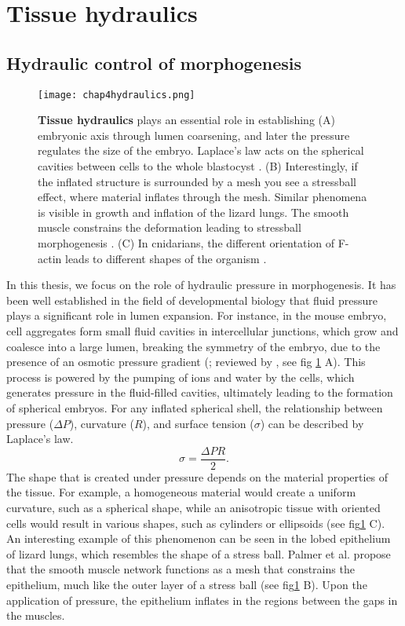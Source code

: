 \hypertarget{tissue-hydraulics}{%
	\section{Tissue hydraulics}\label{tissue-hydraulics}}

\hypertarget{hydraulic-control-of-morphogenesis}{%
	\subsection{Hydraulic control of morphogenesis}\label{hydraulic-control-of-morphogenesis}}


\begin{figure}
	\centering
	\texttt{[image: chap4hydraulics.png]}
	\caption{\label{fig_4_7} \textbf{ Tissue hydraulics} plays an essential role in establishing (A) embryonic axis through lumen coarsening, and later the pressure regulates the size of the embryo. Laplace's law acts on the spherical cavities between cells to the whole blastocyst \cite{dumortier2019,chan2019, collinet2021}. (B) Interestingly, if the inflated structure is surrounded by a mesh you see a stressball effect, where material inflates through the mesh. Similar phenomena is visible in growth and inflation of the lizard lungs. The smooth muscle constrains the deformation leading to stressball morphogenesis \cite{palmer2021}. (C) In cnidarians, the different orientation of F-actin leads to different shapes of the organism \cite{stokkermans2022}.
	}
\end{figure}

In this thesis, we focus on the role of hydraulic pressure in morphogenesis. It has been well established in the field of developmental biology that fluid pressure plays a significant role in lumen expansion. For instance, in the mouse embryo, cell aggregates form small fluid cavities in intercellular junctions, which grow and coalesce into a large lumen, breaking the symmetry of the embryo, due to the presence of an osmotic pressure gradient (\cite{dumortier2019}; reviewed by \cite{torres-sanchez2021}, see fig \ref{fig_4_7} A). This process is powered by the pumping of ions and water by the cells, which generates pressure in the fluid-filled cavities, ultimately leading to the formation of spherical embryos. For any inflated spherical shell, the relationship between pressure ($\Delta P$), curvature ($R$), and surface tension ($\sigma$) can be described by Laplace's law. 
$$ \sigma = \frac{\Delta P R}{2}. $$ 
The shape that is created under pressure depends on the material properties of the tissue. For example, a homogeneous material would create a uniform curvature, such as a spherical shape, while an anisotropic tissue with oriented cells would result in various shapes, such as cylinders or ellipsoids \cite{stokkermans2021} (see fig\ref{fig_4_7} C). An interesting example of this phenomenon can be seen in the lobed epithelium of lizard lungs, which resembles the shape of a stress ball. Palmer et al. propose that the smooth muscle network functions as a mesh that constrains the epithelium, much like the outer layer of a stress ball \cite{palmer2021} (see fig\ref{fig_4_7} B). Upon the application of pressure, the epithelium inflates in the regions between the gaps in the muscles.

